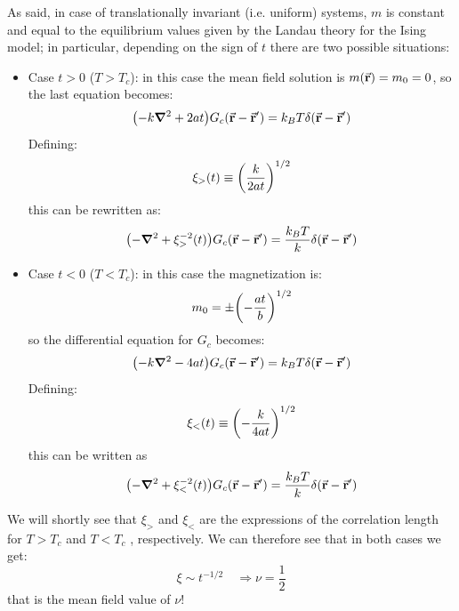 \documentclass[../../Main/Main.tex]{subfiles}
\begin{document}
As said, in case of translationally invariant (i.e. uniform) systems, \( m \) is constant and equal to the equilibrium values given by the Landau theory for the Ising model; in particular, depending on the sign of \( t \) there are two possible situations:
\begin{itemize}

\item Case \( t>0 \) (\( T > T_c \)): in this case the mean field solution is \( m (\va{r}) = m_0 = 0 \), so the last equation becomes:
\begin{equation}
  \qty(-k \grad ^2 + 2 a t ) G_c (\va{r}-\va{r}') = k_B T \delta (\va{r}-\va{r}')
  \label{eq:17_6}
\end{equation}
Defining:
\begin{equation*}
  \xi_> (t) \equiv  \qty(\frac{k}{2 a t })^{1/2}
\end{equation*}
this can be rewritten as:
\begin{equation*}
  \qty(-\grad ^2 + \xi _> ^{-2} (t)) G_c (\va{r}-\va{r}') = \frac{k_B T}{k} \delta (\va{r}-\va{r}')
\end{equation*}


\item Case \( t<0 \) (\( T < T_c \)): in this case the magnetization is:
\begin{equation*}
  m_0 = \pm \qty(-\frac{at}{b})^{1/2}
\end{equation*}
so the differential equation for \( G_c \) becomes:
\begin{equation}
  \qty(-k \grad ^2 - 4 a t ) G_c (\va{r}-\va{r}') = k_B T \delta (\va{r}-\va{r}')
\end{equation}
Defining:
\begin{equation*}
  \xi _{<} (t) \equiv \qty(- \frac{k}{4at})^{1/2}
\end{equation*}
this can be written as
\begin{equation*}
  \qty(-\grad ^2 + \xi _<^{-2} (t))G_c (\va{r}- \va{r}') = \frac{k_B T}{k} \delta (\va{r}- \va{r}')
\end{equation*}

\end{itemize}

We will shortly see that \( \xi _{>} \)  and \( \xi _{<} \)  are the expressions of the correlation length for \( T>T_c \)  and \( T<T_c \) , respectively. We can therefore see that in both cases we get:
\begin{equation}
  \xi \sim t^{-1/2} \quad \Rightarrow \nu  = \frac{1}{2}
\end{equation}
that is the mean field value of \( \nu  \)!
\end{document}
